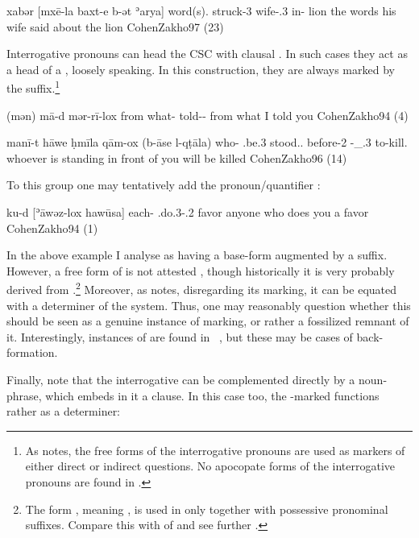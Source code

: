 {xabər [mxē-la baxt-e b-ət ʾarya]}
{word(s).\cst{} struck-3\fem{} wife-\poss.3\masc{} in-\cst{} lion}
{the words his wife said about the lion}
{CohenZakho}{97 (23)}

\largerpage[1.5]
Interrogative pronouns can  head the CSC with clausal \secns. In such cases they act as a head of a , loosely speaking. In this construction, they are always marked by the \cst* suffix.\footnote{As \citet[96]{CohenZakho} notes, the free forms of the interrogative pronouns are used as markers of either direct or indirect questions. No apocopate forms of the interrogative pronouns are found in \JZax.}

{(mən) mā-d mər-rī-lox}
{from what-\cst{} told-\sg-\masc}
{from what I told you}
{CohenZakho}{94 (4)}

{manī-t hāwe ḥmīla qām-ox (b-āse l-qṭāla)}
{who-\cst{} \sbjv.be.3\masc{} stood.\resl.\masc{} before-2\masc{} \fut-\pass\_\aux.3\masc{} to-kill.\inf}
{whoever is standing in front of you will be killed}
{CohenZakho}{96 (14)}

To this group one may tentatively add the pronoun/quantifier :

{ku-d [ʾāwəz-lox hawūsa]}
{each-\cst{} \sbjv.do.3\masc-\dat.2\masc{} favor}
{anyone who does you a favor}
{CohenZakho}{94 (1)}

In the above example I analyse  as having a base-form  augmented by a \cst* suffix. However, a free form of  is not attested  \citep[94, fn. 5]{CohenZakho}, though historically it is very probably derived from  \citep[181b]{SabarDictionary}.\footnote{The form , meaning , is used in \JZax only together with possessive pronominal suffixes. Compare this with  of  \Qar and see further \citet[282f.]{KhanQaraqosh}.} Moreover, as \citet[3]{CohenDetermination} notes, disregarding its  marking, it can be equated with a determiner of the \JZax system. Thus, one may reasonably question whether this should be seen as a genuine instance of \cst* marking, or rather a fossilized remnant of it. Interestingly, instances of  are found in \Nrt\  \citep[181b]{SabarDictionary}, but these may be cases of back-formation.

Finally, note that the interrogative  can be complemented directly by a noun-phrase, which embeds in it a clause. In this case too, the \cst*-marked  functions rather as a determiner:

